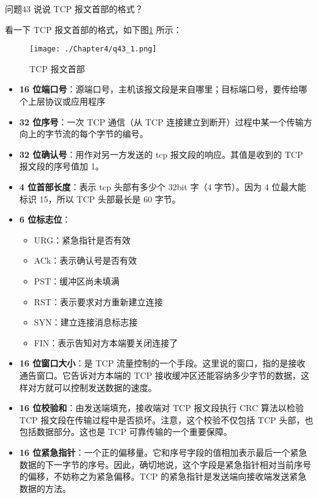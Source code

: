 \documentclass[cn,11pt,color=blue,lang=cn]{elegantbook}
\begin{document}
\begin{custom}{问题43}
说说 TCP 报文首部的格式？
\end{custom}
\begin{solution}
看一下 TCP 报文首部的格式，如下图\ref{fig43_1} 所示：
\begin{figure}[htbp]
\centering
\texttt{[image: ./Chapter4/q43\_1.png]}
\caption{TCP 报文首部}
\label{fig43_1}
\end{figure}
\begin{itemize}
	\item \textbf{16 位端口号}：源端口号，主机该报文段是来自哪里；目标端口号，要传给哪个上层协议或应用程序
	\item \textbf{32 位序号}：一次 TCP 通信（从 TCP 连接建立到断开）过程中某一个传输方向上的字节流的每个字节的编号。
	\item \textbf{32 位确认号}：用作对另一方发送的 tcp 报文段的响应。其值是收到的 TCP 报文段的序号值加 1。
	\item \textbf{4 位首部长度}：表示 tcp 头部有多少个 32bit 字（4 字节）。因为 4 位最大能标识 15，所以 TCP 头部最长是 60 字节。
	\item \textbf{6 位标志位}：
		\begin{itemize}
			\item URG：紧急指针是否有效
			\item ACk：表示确认号是否有效
			\item PST：缓冲区尚未填满
			\item RST：表示要求对方重新建立连接
			\item SYN：建立连接消息标志接
			\item FIN：表示告知对方本端要关闭连接了
		\end{itemize}
	\item \textbf{16 位窗口大小}：是 TCP 流量控制的一个手段。这里说的窗口，指的是接收通告窗口。它告诉对方本端的 TCP 接收缓冲区还能容纳多少字节的数据，这样对方就可以控制发送数据的速度。
	\item \textbf{16 位校验和}：由发送端填充，接收端对 TCP 报文段执行 CRC 算法以检验 TCP 报文段在传输过程中是否损坏。注意，这个校验不仅包括 TCP 头部，也包括数据部分。这也是 TCP 可靠传输的一个重要保障。
	\item \textbf{16 位紧急指针}：一个正的偏移量。它和序号字段的值相加表示最后一个紧急数据的下一字节的序号。因此，确切地说，这个字段是紧急指针相对当前序号的偏移，不妨称之为紧急偏移。TCP 的紧急指针是发送端向接收端发送紧急数据的方法。
\end{itemize}
\end{solution}
\end{document}
